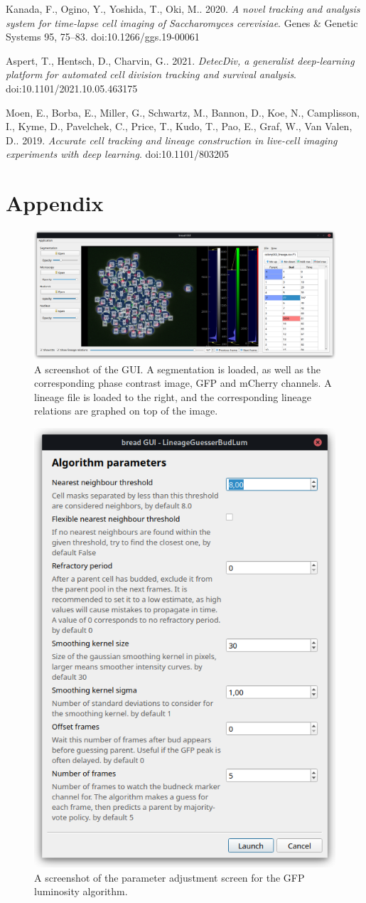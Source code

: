 \documentclass{TP}
\begin{document}
\begin{thebibliography}{99}
Kanada, F., Ogino, Y., Yoshida, T., Oki, M.. 2020. \textit{A novel tracking and analysis system for time-lapse cell imaging of Saccharomyces cerevisiae}. Genes & Genetic Systems 95, 75–83. doi:10.1266/ggs.19-00061

Aspert, T., Hentsch, D., Charvin, G.. 2021. \textit{DetecDiv, a generalist deep-learning platform for automated cell division tracking and survival analysis}. doi:10.1101/2021.10.05.463175

Moen, E., Borba, E., Miller, G., Schwartz, M., Bannon, D., Koe, N., Camplisson, I., Kyme, D., Pavelchek, C., Price, T., Kudo, T., Pao, E., Graf, W., Van Valen, D.. 2019. \textit{Accurate cell tracking and lineage construction in live-cell imaging experiments with deep learning}. doi:10.1101/803205

\end{thebibliography}

\appendix

\onecolumn
\newpage
\section{Appendix}
\label{annexe}
\begin{figure}[H]
\centering
\includegraphics[width= \linewidth]{Figures/gui.png}
\captionsetup{justification=raggedright}
\caption{A screenshot of the GUI. A segmentation is loaded, as well as the corresponding phase contrast image, GFP and mCherry channels. A lineage file is loaded to the right, and the corresponding lineage relations are graphed on top of the image.}
\label{fig:gui}
\end{figure}


\begin{figure}[H]
\centering
\includegraphics[width=0.5\linewidth]{Figures/param_budlum.png}
\captionsetup{justification=raggedright}
\caption{A screenshot of the parameter adjustment screen for the GFP luminosity algorithm.}
\label{fig:wizard}
\end{figure}
\end{document}
